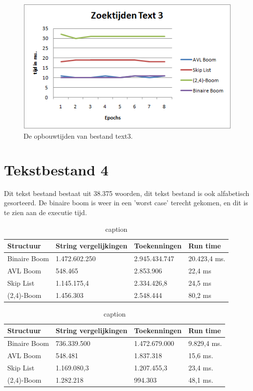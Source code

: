 \begin{figure}[h]
	\centering
		\includegraphics[width=\textwidth]{chap7/zoektijdtext3}
		\caption{De opbouwtijden van bestand text3.}
	\label{fig:zoektext3}
\end{figure}


\clearpage

\section{Tekstbestand 4}

Dit tekst bestand bestaat uit 38.375 woorden, dit tekst bestand is ook alfabetisch gesorteerd. De binaire boom is weer in een 'worst case' terecht gekomen, en dit is te zien aan de executie tijd.

\begin{table}
\begin{tabularx}{\linewidth}{| l | X| X| X | }
 \hline
 Structuur & String vergelijkingen &  Toekenningen & Run time \\
 \hline
 	Binaire Boom & 1.472.602.250& 2.945.434.747  & 20.423,4 ms. \\
 	\hline
 	AVL Boom & 548.465 & 2.853.906 & 22,4 ms \\
 	\hline
 	Skip List & 1.145.175,4 & 2.334.426,8 & 24,5  ms \\
 	\hline
 	(2,4)-Boom & 1.456.303 & 2.548.444 & 80,2 ms \\
 	\hline
\end{tabularx}
\label{tbl_text1_search}
\caption{caption}
\end{table}


\begin{table}
\begin{tabularx}{\linewidth}{| l | X| X| X | }
 \hline
 Structuur & String vergelijkingen &  Toekenningen & Run time \\
 \hline
 	Binaire Boom & 736.339.500 & 1.472.679.000 & 9.829,4 ms. \\
 	\hline
 	AVL Boom & 548.481 & 1.837.318  & 15,6 ms. \\
 	\hline
 	Skip List & 1.169.080,3& 1.207.455,3 &  23,4 ms. \\
 	\hline
 	(2,4)-Boom & 1.282.218 & 994.303 & 48,1 ms. \\
 	\hline
\end{tabularx}
\label{tbl_text1_search}
\caption{caption}
\end{table}


